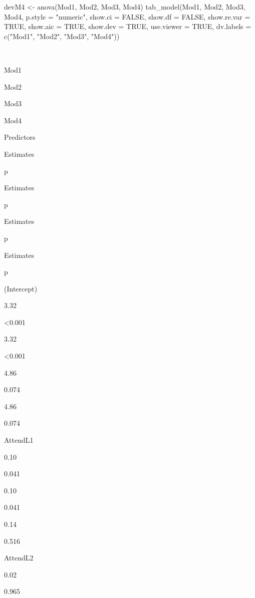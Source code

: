 \documentclass[
  11pt,
]{book}
\newenvironment{Shaded}{\begin{snugshade}}{\end{snugshade}}
\newcommand{\AttributeTok}[1]{\textcolor[rgb]{0.77,0.63,0.00}{#1}}
\newcommand{\ConstantTok}[1]{\textcolor[rgb]{0.00,0.00,0.00}{#1}}
\newcommand{\FunctionTok}[1]{\textcolor[rgb]{0.00,0.00,0.00}{#1}}
\newcommand{\NormalTok}[1]{#1}
\newcommand{\OtherTok}[1]{\textcolor[rgb]{0.56,0.35,0.01}{#1}}
\newcommand{\StringTok}[1]{\textcolor[rgb]{0.31,0.60,0.02}{#1}}
\begin{document}
\begin{Shaded}
\begin{Highlighting}[]
\NormalTok{devM4 }\OtherTok{\textless{}{-}} \FunctionTok{anova}\NormalTok{(Mod1, Mod2, Mod3, Mod4) }
\FunctionTok{tab\_model}\NormalTok{(Mod1, Mod2, Mod3, Mod4, }\AttributeTok{p.style =} \StringTok{"numeric"}\NormalTok{, }\AttributeTok{show.ci =} \ConstantTok{FALSE}\NormalTok{, }\AttributeTok{show.df =} \ConstantTok{FALSE}\NormalTok{, }\AttributeTok{show.re.var =} \ConstantTok{TRUE}\NormalTok{, }\AttributeTok{show.aic =} \ConstantTok{TRUE}\NormalTok{, }\AttributeTok{show.dev =} \ConstantTok{TRUE}\NormalTok{, }\AttributeTok{use.viewer =} \ConstantTok{TRUE}\NormalTok{, }\AttributeTok{dv.labels =} \FunctionTok{c}\NormalTok{(}\StringTok{"Mod1"}\NormalTok{, }\StringTok{"Mod2"}\NormalTok{, }\StringTok{"Mod3"}\NormalTok{, }\StringTok{"Mod4"}\NormalTok{))}
\end{Highlighting}
\end{Shaded}

~

Mod1

Mod2

Mod3

Mod4

Predictors

Estimates

p

Estimates

p

Estimates

p

Estimates

p

(Intercept)

3.32

\textless0.001

3.32

\textless0.001

4.86

0.074

4.86

0.074

AttendL1

0.10

0.041

0.10

0.041

0.14

0.516

AttendL2

0.02

0.965
\end{document}

